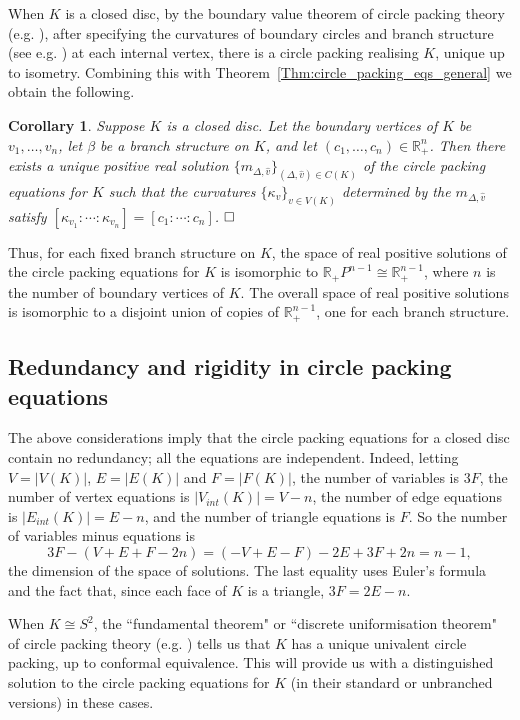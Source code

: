 \documentclass[12pt]{amsart}
\renewcommand{\qed}{$\hfill\square$}
\numberwithin{equation}{section}
\newtheorem{cor}[equation]{Corollary}
\theoremstyle{named}
\newcommand{\refthm}[1]{Theorem~\ref{Thm:#1}}
\newcommand{\R}{\mathbb{R}}
\begin{document}
 When $K$ is a closed disc, by the boundary value theorem of circle packing theory (e.g. \cite[thm. 11.6]{StephensonKenneth2005Itcp}), after specifying the curvatures of boundary circles and branch structure (see e.g. \cite[def. 11.4]{StephensonKenneth2005Itcp}) at each internal vertex, there is a circle packing realising $K$, unique up to isometry. Combining this with \refthm{circle_packing_eqs_general} we obtain the following.
\begin{cor}
 Suppose $K$ is a closed disc. Let the boundary vertices of $K$ be $v_1, \ldots, v_n$, let $\beta$ be a branch structure on $K$, and let $(c_1, \ldots, c_n) \in \R_+^n$. Then there exists a unique positive real solution $\{m_{\Delta,\widehat{v}}\}_{(\Delta,\widehat{v}) \in C(K)}$ of the circle packing equations for $K$ such that the curvatures $\{\kappa_v\}_{v \in V(K)}$ determined by the $m_{\Delta,\widehat{v}}$ satisfy $[\kappa_{v_1} : \cdots : \kappa_{v_n}] = [c_1 : \cdots : c_n]$.
\qed
\end{cor}

Thus, for each fixed branch structure on $K$, the space of real positive solutions of the circle packing equations for $K$ is isomorphic to $\R_+ P^{n-1} \cong \R_+^{n-1}$, where $n$ is the number of boundary vertices of $K$. The overall space of real positive solutions is isomorphic to a disjoint union of copies of $\R_+^{n-1}$, one for each branch structure.

\subsection{ Redundancy and rigidity in circle packing equations}
\label{Sec:redundancy_rigidity}
 The above considerations imply
that the circle packing equations for a closed disc contain no redundancy; all the equations are independent. Indeed, letting $V=|V(K)|$, $E=|E(K)|$ and $F = |F(K)|$, the number of variables is $3F$, the number of vertex equations is $|V_{int}(K)| = V - n$, the number of edge equations is $|E_{int}(K)| = E - n$, and the number of triangle equations is $F$. So the number of variables minus equations is
\[
3F - \left( V + E + F - 2n \right)
= \left( -V + E - F \right) - 2E + 3F + 2n 
= n-1,
\]
the dimension of the space of solutions. The last equality uses Euler's formula and the fact that, since each face of $K$ is a triangle, $3F = 2E - n$.


When $K \cong S^2$, the ``fundamental theorem" or ``discrete uniformisation theorem" of circle packing theory (e.g. \cite[thm. 4.3]{StephensonKenneth2005Itcp}) tells us that $K$ has a unique univalent circle packing, up to conformal equivalence. This will provide us with a distinguished solution to the circle packing equations for $K$ (in their standard or unbranched versions) in these cases.
\end{document}
